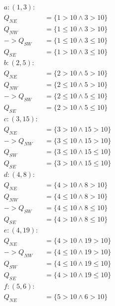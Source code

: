 \documentclass{report}
\begin{document}
  \break

  \begin{multicols}{2}
    \begin{equation*}
      \begin{split}
        a : (1, 3) : & \\
             Q_{NE} & = \{1 > 10 \land 3 > 10\} \\
             Q_{NW} & = \{1 \leq 10 \land 3 > 10\} \\
             -> Q_{SW} & = \{1 \leq 10 \land 3 \leq 10\} \\
             Q_{SE} & = \{1 > 10 \land 3 \leq 10\} \\
        b : (2, 5) : & \\
             Q_{NE} & = \{2 > 10 \land 5 > 10\} \\
             Q_{NW} & = \{2 \leq 10 \land 5 > 10\} \\
             ->Q_{SW} & = \{2 \leq 10 \land 5 \leq 10\} \\
             Q_{SE} & = \{2 > 10 \land 5 \leq 10\} \\
        c : (3, 15) : \\
             Q_{NE} & = \{3 > 10 \land 15 > 10\} \\
             ->Q_{NW} & = \{3 \leq 10 \land 15 > 10\} \\
             Q_{SW} & = \{3 \leq 10 \land 15 \leq 10\} \\
             Q_{SE} & = \{3 > 10 \land 15 \leq 10\} \\
        d : (4, 8) : \\
             Q_{NE} & = \{4 > 10 \land 8 > 10\} \\
             Q_{NW} & = \{4 \leq 10 \land 8 > 10\} \\
             ->Q_{SW} & = \{4 \leq 10 \land 8 \leq 10\} \\
             Q_{SE} & = \{4 > 10 \land 8 \leq 10\} \\
        e : (4, 19) : \\
             Q_{NE} & = \{4 > 10 \land 19 > 10\} \\
             ->Q_{NW} & = \{4 \leq 10 \land 19 > 10\} \\
             Q_{SW} & = \{4 \leq 10 \land 19 \leq 10\} \\
             Q_{SE} & = \{4 > 10 \land 19 \leq 10\} \\
        f : (5, 6) : \\
             Q_{NE} & = \{5 > 10 \land 6 > 10\} \\

\end{split}
\end{equation*}
\end{multicols}
\end{document}
